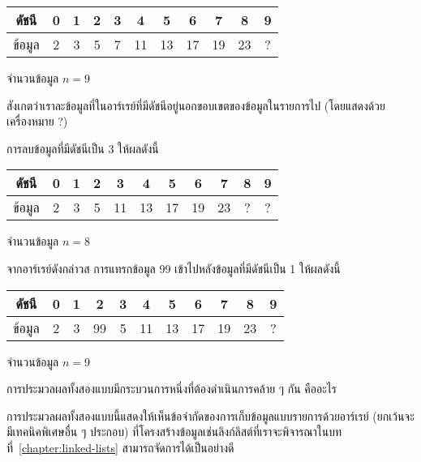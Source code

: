 \begin{center}
\begin{tabular}{|c|c|c|c|c|c|c|c|c|c|c|}
\hline
ดัชนี & 0 & 1 & 2 & 3 & 4 & 5 & 6 & 7 & 8 & 9\\
\hline
ข้อมูล & 2 & 3 & 5 & 7 & 11 & 13 & 17 & 19 & 23 & ?\\
\hline
\end{tabular}

จำนวน{\wbr}ข้อมูล $n = 9$
\end{center}

สังเกต{\wbr}ว่า{\wbr}เรา{\wbr}ละ{\wbr}ข้อมูล{\wbr}ที่{\wbr}ใน{\wbr}อาร์เรย์{\wbr}ที่{\wbr}มี{\wbr}ดัชนี{\wbr}อยู่{\wbr}นอก{\wbr}ขอบเขต{\wbr}ของ{\wbr}ข้อมูล{\wbr}ใน{\wbr}รายการ{\wbr}ไป{\wbr}
(โดย{\wbr}แสดง{\wbr}ด้วย{\wbr}เครื่องหมาย ?)

การ{\wbr}ลบ{\wbr}ข้อมูล{\wbr}ที่{\wbr}มี{\wbr}ดัชนี{\wbr}เป็น 3 ให้{\wbr}ผล{\wbr}ดังนี้{\wbr}

\begin{center}
\begin{tabular}{|c|c|c|c|c|c|c|c|c|c|c|}
\hline
ดัชนี & 0 & 1 & 2 & 3 & 4 & 5 & 6 & 7 & 8 & 9\\
\hline
ข้อมูล & 2 & 3 & 5 & 11 & 13 & 17 & 19 & 23 & ? & ? \\
\hline
\end{tabular}

จำนวน{\wbr}ข้อมูล $n = 8$
\end{center}

จาก{\wbr}อาร์เรย์{\wbr}ดังกล่าว{\wbr}ส การ{\wbr}แทรก{\wbr}ข้อมูล 99 เข้า{\wbr}ไป{\wbr}หลัง{\wbr}ข้อมูล{\wbr}ที่{\wbr}มี{\wbr}ดัชนี{\wbr}เป็น 1 ให้{\wbr}ผล{\wbr}ดังนี้{\wbr}

\begin{center}
\begin{tabular}{|c|c|c|c|c|c|c|c|c|c|c|}
\hline
ดัชนี & 0 & 1 & 2 & 3 & 4 & 5 & 6 & 7 & 8 & 9\\
\hline
ข้อมูล & 2 & 3 & 99 & 5 & 11 & 13 & 17 & 19 & 23 & ? \\
\hline
\end{tabular}

จำนวน{\wbr}ข้อมูล $n = 9$
\end{center}

\begin{quiz}{}
การ{\wbr}ประมวลผล{\wbr}ทั้ง{\wbr}สอง{\wbr}แบบ{\wbr}มี{\wbr}กระบวนการ{\wbr}หนึ่ง{\wbr}ที่{\wbr}ต้อง{\wbr}ดำเนินการ{\wbr}คล้าย ๆ กัน คือ{\wbr}อะไร{\wbr}
\end{quiz}

การ{\wbr}ประมวลผล{\wbr}ทั้ง{\wbr}สอง{\wbr}แบบ{\wbr}นี้{\wbr}แสดง{\wbr}ให้{\wbr}เห็น{\wbr}ข้อจำกัด{\wbr}ของ{\wbr}การ{\wbr}เก็บ{\wbr}ข้อมูล{\wbr}แบบ{\wbr}รายการ{\wbr}ด้วย{\wbr}อาร์เรย์
(ยกเว้น{\wbr}จะ{\wbr}มี{\wbr}เทคนิค{\wbr}พิเศษ{\wbr}อื่น ๆ ประกอบ)
ที่{\wbr}โครงสร้าง{\wbr}ข้อมูล{\wbr}เช่น{\wbr}ลิงก์ลิสต์{\wbr}ที่{\wbr}เรา{\wbr}จะ{\wbr}พิจารณา{\wbr}ใน{\wbr}บท{\wbr}ที่~\ref{chapter:linked-lists}
สามารถ{\wbr}จัดการ{\wbr}ได้{\wbr}เป็น{\wbr}อย่าง{\wbr}ดี{\wbr}

